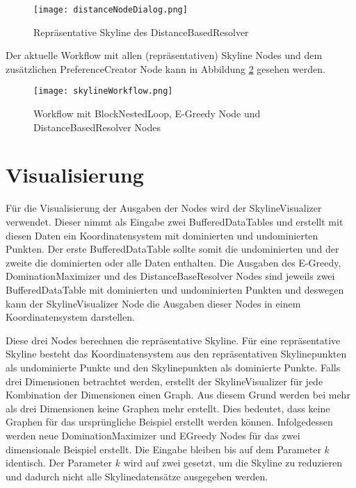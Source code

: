 \begin{figure}[H]
	\centering
	\texttt{[image: distanceNodeDialog.png]}
	\caption{Repräsentative Skyline des DistanceBasedResolver}
	\label{img:distanceOutput}
\end{figure} 

Der aktuelle Workflow mit allen (repräsentativen) Skyline Nodes und dem zusätzlichen PreferenceCreator Node kann in Abbildung \ref{img:skylineWorkflow} gesehen werden.

\begin{figure}[H]
	\centering
	\texttt{[image: skylineWorkflow.png]}
	\caption{Workflow mit BlockNestedLoop, E-Greedy Node und DistanceBasedResolver Nodes}
	\label{img:skylineWorkflow}
\end{figure} 
\section{Visualisierung}
\label{ch:Evaluierung:sec:visualize}
Für die Visualisierung der Ausgaben der Nodes wird der SkylineVisualizer verwendet. Dieser nimmt als Eingabe zwei BufferedDataTables und erstellt mit diesen Daten ein Koordinatensystem mit dominierten und undominierten Punkten. Der erste BufferedDataTable sollte somit die undominierten und der zweite die dominierten oder alle Daten enthalten. Die Ausgaben des E-Greedy, DominationMaximizer und des DistanceBaseResolver Nodes sind jeweils zwei BufferedDataTable mit dominierten und undominierten Punkten und deswegen kann der SkylineVisualizer Node die Ausgaben dieser Nodes in einem Koordinatensystem darstellen.

Diese drei Nodes berechnen die repräsentative Skyline. Für eine repräsentative Skyline besteht das Koordinatensystem aus den repräsentativen Skylinepunkten als undominierte Punkte und den Skylinepunkten als dominierte Punkte. Falls drei Dimensionen betrachtet werden, erstellt der SkylineVisualizer für jede Kombination der Dimensionen einen Graph. Aus diesem Grund werden bei mehr als drei Dimensionen keine Graphen mehr erstellt. Dies bedeutet, dass keine Graphen für das ursprüngliche Beispiel erstellt werden können. Infolgedessen werden neue DominationMaximizer und EGreedy Nodes für das zwei dimensionale Beispiel erstellt. Die Eingabe bleiben bis auf dem Parameter $k$ identisch. Der Parameter $k$ wird auf zwei gesetzt, um die Skyline zu reduzieren und dadurch nicht alle Skylinedatensätze ausgegeben werden. 

